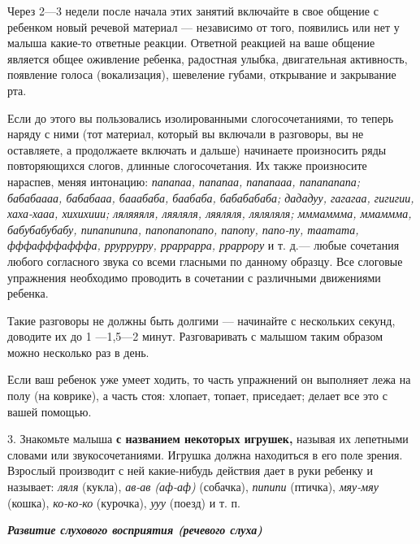 \documentclass[a5paper]{book}
\renewcommand{\emph}[1]{\textit{#1}}
\begin{document}
Через 2---3 недели после начала этих занятий включайте в свое общение с
ребенком новый речевой материал --- независимо от того, появились или
нет у малыша какие-то ответные реакции. Ответной реакцией на ваше
общение является общее оживление ребенка, радостная улыбка, двигательная
активность, появление голоса (вокализация), шевеление губами, открывание
и закрывание рта.

Если до этого вы пользовались изолированными слогосочетаниями, то теперь
наряду с ними (тот материал, который вы включали в разговоры, вы не
оставляете, а продолжаете включать и дальше) начинаете произносить ряды
повторяющихся слогов, длинные слогосочетания. Их также произносите
нараспев, меняя интонацию: \emph{папапаа, папапаа, папапааа, папапапапа;
бабабаааа, бабабааа, бааабаба, баабаба, бабабабаба; дададуу, гагагаа,
гигигии, хаха-хааа, хихихиии; ляляяяля, ляяляля, ляяляля, ляляляля;
мммаммма, ммаммма, бабубабубабу, пипапипипа, папопапопапо, папопу,
папо-пу, таатата, фффафффафффа, рруррурру, рраррарра, рраррору} и т.
д.--- любые сочетания любого согласного звука со всеми гласными по
данному образцу. Все слоговые упражнения необходимо проводить в
сочетании с различными движениями ребенка.

Такие разговоры не должны быть долгими --- начинайте с нескольких
секунд, доводите их до 1 ---1,5---2 минут. Разговаривать с малышом таким
образом можно несколько раз в день.

Если ваш ребенок уже умеет ходить, то часть упражнений он выполняет лежа
на полу (на коврике), а часть стоя: хлопает, топает, приседает; делает
все это с вашей помощью.

3. Знакомьте малыша \textbf{с названием некоторых игрушек,} называя их
лепетными словами или звукосочетаниями. Игрушка должна находиться в его
поле зрения. Взрослый производит с ней какие-нибудь действия дает в руки
ребенку и называет: \emph{ляля} (кукла), \emph{ав-ав (аф-аф)} (собачка),
\emph{пипипи} (птичка), \emph{мяу-мяу} (кошка), \emph{ко-ко-ко}
(курочка), \emph{ууу} (поезд) и т. п.

\emph{\textbf{Развитие слухового восприятия (речевого слуха)}}
\end{document}
